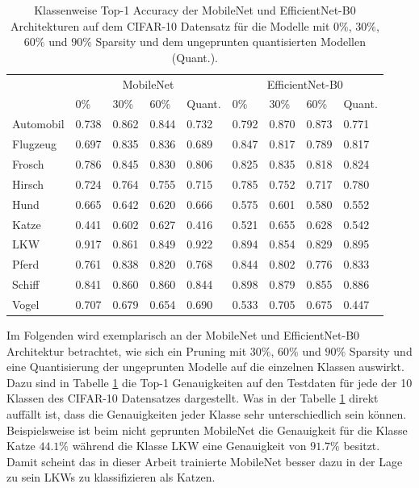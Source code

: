 \begin{table}[ht]
\centering
\begin{tabular}{l|llll|llll}
\toprule
               & \multicolumn{4}{c}{MobileNet}           & \multicolumn{4}{c}{EfficientNet-B0} \\
               &       0\% &   30\% &   60\% &    Quant. &    0\% &   30\% &   60\%   & Quant. \\
\midrule
Automobil      &     0.738 &  0.862 &  0.844 &     0.732 &    0.792 &  0.870 &  0.873 &     0.771 \\
Flugzeug       &     0.697 &  0.835 &  0.836 &     0.689 &    0.847 &  0.817 &  0.789 &     0.817 \\
Frosch         &     0.786 &  0.845 &  0.830 &     0.806 &    0.825 &  0.835 &  0.818 &     0.824 \\
Hirsch         &     0.724 &  0.764 &  0.755 &     0.715 &    0.785 &  0.752 &  0.717 &     0.780 \\
Hund           &     0.665 &  0.642 &  0.620 &     0.666 &    0.575 &  0.601 &  0.580 &     0.552 \\
Katze          &     0.441 &  0.602 &  0.627 &     0.416 &    0.521 &  0.655 &  0.628 &     0.542 \\
LKW &     0.917 &  0.861 &  0.849 &     0.922 &    0.894 &  0.854 &  0.829 &     0.895 \\
Pferd          &     0.761 &  0.838 &  0.820 &     0.768 &    0.844 &  0.802 &  0.776 &     0.833 \\
Schiff         &     0.841 &  0.860 &  0.860 &     0.844 &    0.898 &  0.879 &  0.855 &     0.886 \\
Vogel          &     0.707 &  0.679 &  0.654 &     0.690 &    0.533 &  0.705 &  0.675 &     0.447 \\
\bottomrule
\end{tabular}
\caption{Klassenweise Top-1 Accuracy der MobileNet und EfficientNet-B0 Architekturen auf dem CIFAR-10 Datensatz für die Modelle mit $0\%$, $30\%$, $60\%$ und $90\%$ Sparsity und dem ungeprunten quantisierten Modellen (Quant.).}
\label{t4.6}
\end{table}

Im Folgenden wird exemplarisch an der MobileNet und EfficientNet-B0 Architektur betrachtet, wie sich ein Pruning mit $30\%$, $60\%$ und $90\%$ Sparsity und eine Quantisierung der ungeprunten Modelle auf die einzelnen Klassen auswirkt. Dazu sind in Tabelle \ref{t4.6} die Top-1 Genauigkeiten auf den Testdaten für jede der 10 Klassen des CIFAR-10 Datensatzes dargestellt. Was in der Tabelle \ref{t4.6} direkt auffällt ist, dass die Genauigkeiten jeder Klasse sehr unterschiedlich sein können. Beispielsweise ist beim nicht geprunten MobileNet die Genauigkeit für die Klasse Katze $44.1\%$ während die Klasse LKW eine Genauigkeit von $91.7\%$ besitzt. Damit scheint das in dieser Arbeit trainierte MobileNet besser dazu in der Lage zu sein LKWs zu klassifizieren als Katzen.

